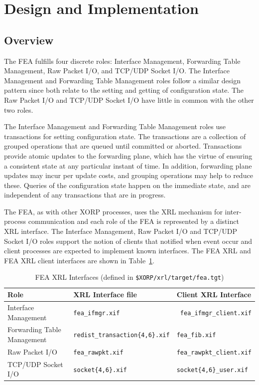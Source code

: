 \documentclass[11pt]{article}
\begin{document}
\section{Design and Implementation}
\label{sec:design_and_implementation}

\subsection{Overview}

The FEA fulfills four discrete roles: Interface Management, Forwarding
Table Management, Raw Packet I/O, and TCP/UDP Socket I/O.  The Interface
Management and Forwarding Table Management roles follow a similar
design pattern since both relate to the setting and getting of
configuration state.  The Raw Packet I/O and TCP/UDP Socket I/O have
little in common with the other two roles.

The Interface Management and Forwarding Table Management roles use
transactions for setting configuration state.  The transactions are a
collection of grouped operations that are queued until committed or
aborted.  Transactions provide atomic updates to the forwarding plane,
which has the virtue of ensuring a consistent state at any particular
instant of time.  In addition, forwarding plane updates may incur per
update costs, and grouping operations may help to reduce
these. Queries of the configuration state happen on the immediate
state, and are independent of any transactions that are in progress.

The FEA, as with other XORP processes, uses the XRL mechanism for
inter-process communication and each role of the FEA is represented by
a distinct XRL interface.  The Interface Management,
Raw Packet I/O and TCP/UDP Socket I/O roles support the notion of
clients that notified when event occur and client processes are expected
to implement known interfaces.  The FEA XRL and FEA XRL client
interfaces are shown in Table~\ref{tbl:xifs}.

\begin{table}[h]
\begin{center}
\begin{tabular}{|l|l|l|}\hline
Role & XRL Interface file & Client XRL Interface\\ \hline\hline
Interface Management 		& {\tt fea\_ifmgr.xif}	& {\tt
  fea\_ifmgr\_client.xif} \\
Forwarding Table Management	& {\tt redist\_transaction\{4,6\}.xif}	& {\tt fea\_fib.xif} \\
Raw Packet I/O	& {\tt fea\_rawpkt.xif} & {\tt fea\_rawpkt\_client.xif} \\
TCP/UDP Socket I/O & {\tt socket\{4,6\}.xif} & {\tt socket\{4,6\}\_user.xif} \\
\hline
\end{tabular}
\caption{FEA XRL Interfaces (defined in {\tt \$XORP/xrl/target/fea.tgt})}
\label{tbl:xifs}
\end{center}
\end{table}
\end{document}
